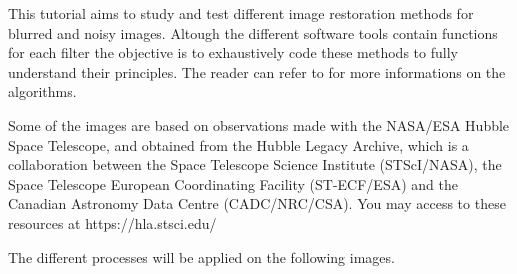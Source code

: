 \def\difficulty{3}

\begin{note}This tutorial aims to study and test different image restoration methods for blurred and noisy images. Altough the different software tools contain functions for each filter 
the objective is to exhaustively code these methods to fully understand their principles. The reader can refer to \cite{Sage2017} for more informations on the algorithms.

Some of the images are based on observations made with the NASA/ESA Hubble Space Telescope, and obtained from the Hubble Legacy Archive, which is a collaboration between the Space Telescope Science Institute (STScI/NASA), the Space Telescope European Coordinating Facility (ST-ECF/ESA) and the Canadian Astronomy Data Centre (CADC/NRC/CSA). You may access to these resources at https://hla.stsci.edu/
\end{note}


\noindent The different processes will be applied on the following images.

